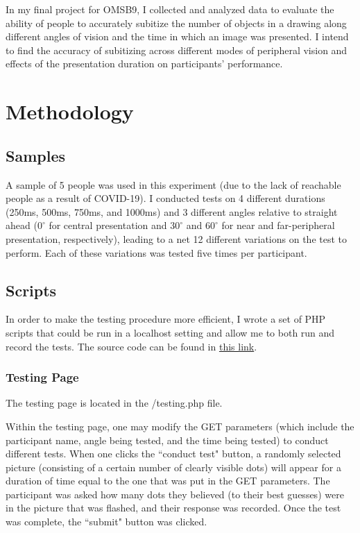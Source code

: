\documentclass[12pt]{article}
\begin{document}
In my final project for OMSB9, I collected and analyzed data to evaluate the
ability of people to accurately subitize the number of objects in a drawing
along different angles of vision and the time in which an image was presented.
I intend to find the accuracy of subitizing across different modes of
peripheral vision and effects of the presentation duration on participants'
performance.

\section{Methodology}

\subsection{Samples}
A sample of 5 people was used in this experiment (due to the lack of reachable
people as a result of COVID-19). I conducted tests on 4 different
durations (250ms, 500ms, 750ms, and 1000ms) and 3 different angles relative to
straight ahead ($0^{\circ}$ for central presentation and $30^{\circ}$ and
$60^{\circ}$ for near and far-peripheral presentation, respectively),
leading to a net 12 different variations on the test to perform. Each
of these variations was tested five times per participant.

\subsection{Scripts}

In order to make the testing procedure more efficient, I wrote a set of PHP
scripts that could be run in a localhost setting and allow me to both run and record the
tests. The source code can be found in
\href{https://github.com/junikimm717/OMSB9-Final-Project}{this link}.

\subsubsection{Testing Page}
The testing page is located in the /testing.php file.

Within the testing page, one may modify the GET parameters (which include the
participant name, angle being tested, and the time being tested) to
conduct different tests. When one clicks the ``conduct test" button, a randomly
selected picture (consisting of a certain number of clearly visible dots) will
appear for a duration of time equal to the one that was put in the GET
parameters. The participant was asked how many dots they believed (to their
best guesses) were in the picture that was flashed, and their response
was recorded. Once the test was complete, the ``submit" button was clicked.
\end{document}
